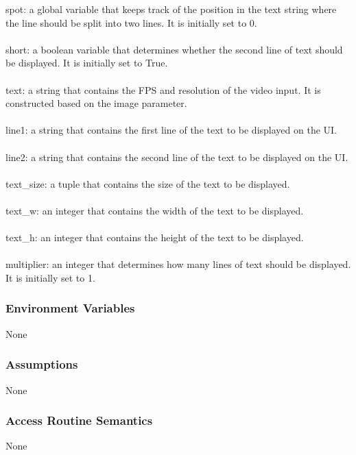 \documentclass[12pt, titlepage]{article}
\begin{document}
spot: a global variable that keeps track of the position in the text string where the line should be split into two lines. It is initially set to 0.\\
\\
short: a boolean variable that determines whether the second line of text should be displayed. It is initially set to True.\\
\\
text: a string that contains the FPS and resolution of the video input. It is constructed based on the image parameter.\\
\\
line1: a string that contains the first line of the text to be displayed on the UI.\\
\\
line2: a string that contains the second line of the text to be displayed on the UI.\\
\\
text\_size: a tuple that contains the size of the text to be displayed.\\
\\
text\_w: an integer that contains the width of the text to be displayed.\\
\\
text\_h: an integer that contains the height of the text to be displayed.\\
\\
multiplier: an integer that determines how many lines of text should be displayed. It is initially set to 1.\\


\subsubsection{Environment Variables}

None\\

\subsubsection{Assumptions}

None\\

\subsubsection{Access Routine Semantics}

None\\
\end{document}
